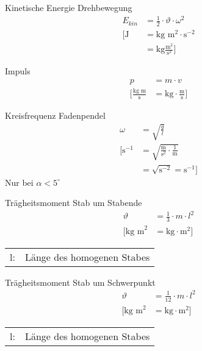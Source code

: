 \begin{karte}{Kinetische Energie Drehbewegung}
    \begin{align*}
        E_{kin} &= \frac{1}{2} \cdot \vartheta \cdot \omega^2 \\
        \bigg[ \text{J} &= \text{kg }\text{m}^2 \cdot \text{s}^{-2} \\
            &= \text{kg} \frac{\text{m}^2}{\text{s}^2} \bigg]
    \end{align*}
\end{karte}

\begin{karte}{Impuls}
    \begin{align*}
        p &= m \cdot v \\
        \bigg[ \frac{\text{kg m}}{\text{s}} &= \text{kg} \cdot \frac{\text{m}}{\text{s}} \bigg]
    \end{align*}
\end{karte}

\begin{karte}{Kreisfrequenz Fadenpendel}
    \begin{align*}
        \omega &= \sqrt{\frac{g}{l}} \\
        \bigg[ \text{s}^{-1} &= \sqrt{ \frac{\text{m}}{\text{s}^2} \cdot \frac{1}{\text{m}} } \\
            &= \sqrt{\text{s}^{-2}} = \text{s}^{-1} \bigg]
    \end{align*}
    Nur bei \(\alpha < 5^\circ\)
\end{karte}

\begin{karte}{Trägheitsmoment Stab um Stabende}
    \begin{align*}
        \vartheta &= \frac{1}{3} \cdot m \cdot l^2 \\
        \bigg[ \text{kg m}^2 &=
            \text{kg} \cdot \text{m}^2 
            \bigg]
    \end{align*}
    \begin{tabular}[t]{cl}
        l:& Länge des homogenen Stabes
    \end{tabular}
\end{karte}

\begin{karte}{Trägheitsmoment Stab um Schwerpunkt}
    \begin{align*}
        \vartheta &= \frac{1}{12} \cdot m \cdot l^2 \\
        \bigg[ \text{kg m}^2 &=
            \text{kg} \cdot \text{m}^2 
            \bigg]
    \end{align*}
    \begin{tabular}[t]{cl}
        l:& Länge des homogenen Stabes
    \end{tabular}
\end{karte}

